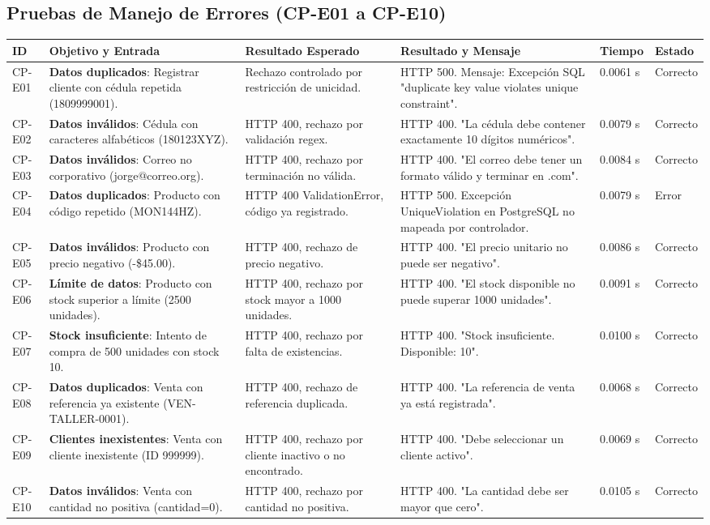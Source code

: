 \documentclass{article}
\begin{document}
\subsection{Pruebas de Manejo de Errores (CP-E01 a CP-E10)}
\begin{longtable}{|p{}|p{}|p{}|p{}|p{}|p{}|}
\hline
\textbf{ID} & \textbf{Objetivo y Entrada} & \textbf{Resultado Esperado} & \textbf{Resultado y Mensaje} & \textbf{Tiempo} & \textbf{Estado}\\
\hline
\endhead
CP-E01 & \textbf{Datos duplicados}: Registrar cliente con cédula repetida (1809999001). & Rechazo controlado por restricción de unicidad. & HTTP 500. Mensaje: Excepción SQL "duplicate key value violates unique constraint". & 0.0061 s & Correcto\\ \hline
CP-E02 & \textbf{Datos inválidos}: Cédula con caracteres alfabéticos (180123XYZ). & HTTP 400, rechazo por validación regex. & HTTP 400. "La cédula debe contener exactamente 10 dígitos numéricos". & 0.0079 s & Correcto\\ \hline
CP-E03 & \textbf{Datos inválidos}: Correo no corporativo (jorge@correo.org). & HTTP 400, rechazo por terminación no válida. & HTTP 400. "El correo debe tener un formato válido y terminar en .com". & 0.0084 s & Correcto\\ \hline
CP-E04 & \textbf{Datos duplicados}: Producto con código repetido (MON144HZ). & HTTP 400 ValidationError, código ya registrado. & HTTP 500. Excepción UniqueViolation en PostgreSQL no mapeada por controlador. & 0.0079 s & Error\\ \hline
CP-E05 & \textbf{Datos inválidos}: Producto con precio negativo (-\$45.00). & HTTP 400, rechazo de precio negativo. & HTTP 400. "El precio unitario no puede ser negativo". & 0.0086 s & Correcto\\ \hline
CP-E06 & \textbf{Límite de datos}: Producto con stock superior a límite (2500 unidades). & HTTP 400, rechazo por stock mayor a 1000 unidades. & HTTP 400. "El stock disponible no puede superar 1000 unidades". & 0.0091 s & Correcto\\ \hline
CP-E07 & \textbf{Stock insuficiente}: Intento de compra de 500 unidades con stock 10. & HTTP 400, rechazo por falta de existencias. & HTTP 400. "Stock insuficiente. Disponible: 10". & 0.0100 s & Correcto\\ \hline
CP-E08 & \textbf{Datos duplicados}: Venta con referencia ya existente (VEN-TALLER-0001). & HTTP 400, rechazo de referencia duplicada. & HTTP 400. "La referencia de venta ya está registrada". & 0.0068 s & Correcto\\ \hline
CP-E09 & \textbf{Clientes inexistentes}: Venta con cliente inexistente (ID 999999). & HTTP 400, rechazo por cliente inactivo o no encontrado. & HTTP 400. "Debe seleccionar un cliente activo". & 0.0069 s & Correcto\\ \hline
CP-E10 & \textbf{Datos inválidos}: Venta con cantidad no positiva (cantidad=0). & HTTP 400, rechazo por cantidad no positiva. & HTTP 400. "La cantidad debe ser mayor que cero". & 0.0105 s & Correcto\\ \hline
\end{longtable}
\end{document}
